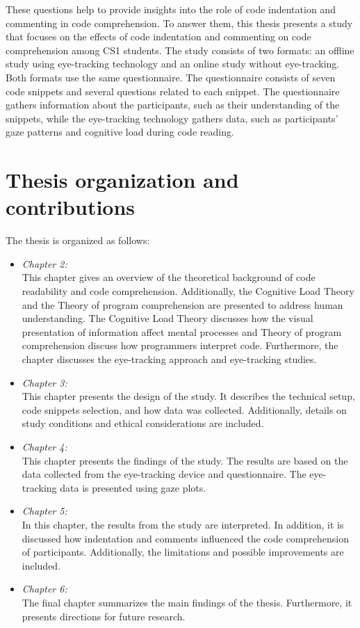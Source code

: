 These questions help to provide insights into the role of code indentation and commenting in code comprehension. 
To answer them, this thesis presents a study that focuses on the effects of code indentation and commenting on code comprehension among CS1 students.
The study consists of two formats: an offline study using eye-tracking technology and an online study without eye-tracking. Both formats use the same questionnaire. The questionnaire consists of seven code snippets and several questions related to each snippet. The questionnaire gathers information about the participants, such as their understanding of the snippets, while the eye-tracking technology gathers data, such as participants’ gaze patterns and cognitive load during code reading.  

\section{Thesis organization and contributions}

The thesis is organized as follows:
\begin{itemize}

\item[] \emph{Chapter 2:} 
\\This chapter gives an overview of the theoretical background of code readability and code comprehension. Additionally, the Cognitive Load Theory and the Theory of program comprehension are presented to address human understanding. The Cognitive Load Theory discusses how the visual presentation of information  affect mental processes and Theory of program comprehension discuss how programmers interpret code. 
Furthermore, the chapter discusses the eye-tracking approach and eye-tracking studies.  


\item[] \emph{Chapter 3:}
\\This chapter presents the design of the study. It describes the technical setup, code snippets selection, and how data was collected. Additionally, details on study conditions and ethical considerations are included.


\item[] \emph{Chapter 4:} 
\\ This chapter presents the findings of the study. The results are based on the data collected from the eye-tracking device and questionnaire. The eye-tracking data is presented using gaze plots.


\item[] \emph{Chapter 5:} 
\\In this chapter, the results from the study are interpreted. In addition, it is discussed how indentation and comments influenced the code comprehension of participants. Additionally, the limitations and possible improvements are included.

\item[] \emph{Chapter 6:} 
\\The final chapter summarizes the main findings of the thesis. Furthermore, it presents directions for future research.

\end{itemize}


